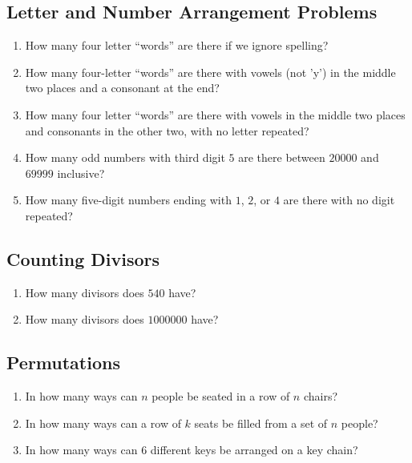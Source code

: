 \documentclass[twocolumn]{article}
\begin{document}
\subsection*{Letter and Number Arrangement Problems}
\begin{enumerate}
	\item How many four letter ``words'' are there if we ignore spelling?
		\vspace{3cm}
	\item How many four-letter ``words'' are there with vowels (not 'y') in the 
		middle two places and a consonant at the end?
		\vspace{3cm}
	\item How many four letter ``words'' are there with vowels in the middle two 
		places and consonants in the other two, with no letter repeated?
		\vspace{3cm}
	\item How many odd numbers with third digit $5$ are there between $20000$ 
		and $69999$ inclusive?
		\vspace{3cm}
	\item How many five-digit numbers ending with $1$, $2$, or $4$ are there 
		with no digit repeated?
		\vspace{3cm}
\end{enumerate}

\subsection*{Counting Divisors}
\begin{enumerate}[resume]
	\item How many divisors does $540$ have?
		\vspace{3cm}
	\item How many divisors does $\num{1000000}$ have?
		\vspace{3cm}
\end{enumerate}

\subsection*{Permutations}
\begin{enumerate}[resume]
	\item In how many ways can $n$ people be seated in a row of $n$ chairs?
		\vspace{3cm}
	\item In how many ways can a row of $k$ seats be filled from a set of $n$ 
		people?
		\vspace{3cm}
	\item In how many ways can $6$ different keys be arranged on a key chain?
		\vspace{3cm}
\end{enumerate}
\end{document}
